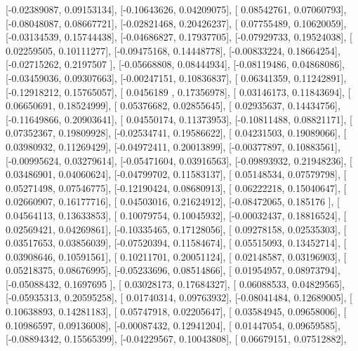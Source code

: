 \documentclass{article}
\begin{document}
       [-0.02389087,  0.09153134],
       [-0.10643626,  0.04209075],
       [ 0.08542761,  0.07060793],
       [-0.08048087,  0.08667721],
       [-0.02821468,  0.20426237],
       [ 0.07755489,  0.10620059],
       [-0.03134539,  0.15744438],
       [-0.04686827,  0.17937705],
       [-0.07929733,  0.19524038],
       [ 0.02259505,  0.10111277],
       [-0.09475168,  0.14448778],
       [-0.00833224,  0.18664254],
       [-0.02715262,  0.2197507 ],
       [-0.05668808,  0.08444934],
       [-0.08119486,  0.04868086],
       [-0.03459036,  0.09307663],
       [-0.00247151,  0.10836837],
       [ 0.06341359,  0.11242891],
       [-0.12918212,  0.15765057],
       [ 0.0456189 ,  0.17356978],
       [ 0.03146173,  0.11843694],
       [ 0.06650691,  0.18524999],
       [ 0.05376682,  0.02855645],
       [ 0.02935637,  0.14434756],
       [-0.11649866,  0.20903641],
       [ 0.04550174,  0.11373953],
       [-0.10811488,  0.08821171],
       [ 0.07352367,  0.19809928],
       [-0.02534741,  0.19586622],
       [ 0.04231503,  0.19089066],
       [ 0.03980932,  0.11269429],
       [-0.04972411,  0.20013899],
       [-0.00377897,  0.10883561],
       [-0.00995624,  0.03279614],
       [-0.05471604,  0.03916563],
       [-0.09893932,  0.21948236],
       [ 0.03486901,  0.04060624],
       [-0.04799702,  0.11583137],
       [ 0.05148534,  0.07579798],
       [ 0.05271498,  0.07546775],
       [-0.12190424,  0.08680913],
       [ 0.06222218,  0.15040647],
       [ 0.02660907,  0.16177716],
       [ 0.04503016,  0.21624912],
       [-0.08472065,  0.185176  ],
       [ 0.04564113,  0.13633853],
       [ 0.10079754,  0.10045932],
       [-0.00032437,  0.18816524],
       [ 0.02569421,  0.04269861],
       [-0.10335465,  0.17128056],
       [ 0.09278158,  0.02535303],
       [ 0.03517653,  0.03856039],
       [-0.07520394,  0.11584674],
       [ 0.05515093,  0.13452714],
       [ 0.03908646,  0.10591561],
       [ 0.10211701,  0.20051124],
       [ 0.02148587,  0.03196903],
       [ 0.05218375,  0.08676995],
       [-0.05233696,  0.08514866],
       [ 0.01954957,  0.08973794],
       [-0.05088432,  0.1697695 ],
       [ 0.03028173,  0.17684327],
       [ 0.06088533,  0.04829565],
       [-0.05935313,  0.20595258],
       [ 0.01740314,  0.09763932],
       [-0.08041484,  0.12689005],
       [ 0.10638893,  0.14281183],
       [ 0.05747918,  0.02205647],
       [ 0.03584945,  0.09658006],
       [ 0.10986597,  0.09136008],
       [-0.00087432,  0.12941204],
       [ 0.01447054,  0.09659585],
       [-0.08894342,  0.15565399],
       [-0.04229567,  0.10043808],
       [ 0.06679151,  0.07512882],
\end{document}
